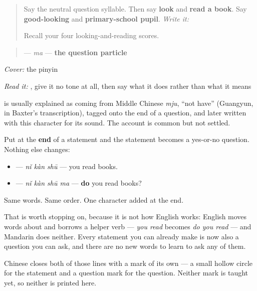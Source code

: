 \label{lesson:ZH-C19-ma}



\begin{quote}
Say the neutral question syllable. Then say \textbf{look} and \textbf{read a book}. Say \textbf{good-looking} and \textbf{primary-school pupil}. \emph{Write it:} 

Recall your four looking-and-reading scores.
\end{quote}

\begin{cousinweb}
\begin{quote}
\textbf{} — \emph{ma} — \textbf{the question particle}
\end{quote}

\emph{Cover:} the pinyin

\emph{Read it:} , give it no tone at all, then say what it does rather than what it means

\textbf{} is usually explained as coming from Middle Chinese \emph{mju}, \textquotedblleft{}not have\textquotedblright{} (Guangyun, in Baxter's transcription), tagged onto the end of a question, and later written with this character for its sound. The account is common but not settled.
\end{cousinweb}

\begin{grammarlens}[title={Grammar lens — one character, every statement}]
Put \textbf{} at the \textbf{end} of a statement and the statement becomes a yes-or-no question. Nothing else changes:

\begin{itemize}
\raggedright
  \item \textbf{} — \emph{nǐ kàn shū} — you read books.
  \item \textbf{} — \emph{nǐ kàn shū ma} — \textbf{do} you read books?
\end{itemize}

Same words. Same order. One character added at the end.

That is worth stopping on, because it is not how English works: English moves words about and borrows a helper verb — \emph{you read} becomes \emph{do you read} — and Mandarin does neither. Every statement you can already make is now also a question you can ask, and there are no new words to learn to ask any of them.

Chinese closes both of those lines with a mark of its own — a small hollow circle for the statement and a question mark for the question. Neither mark is taught yet, so neither is printed here.
\end{grammarlens}

